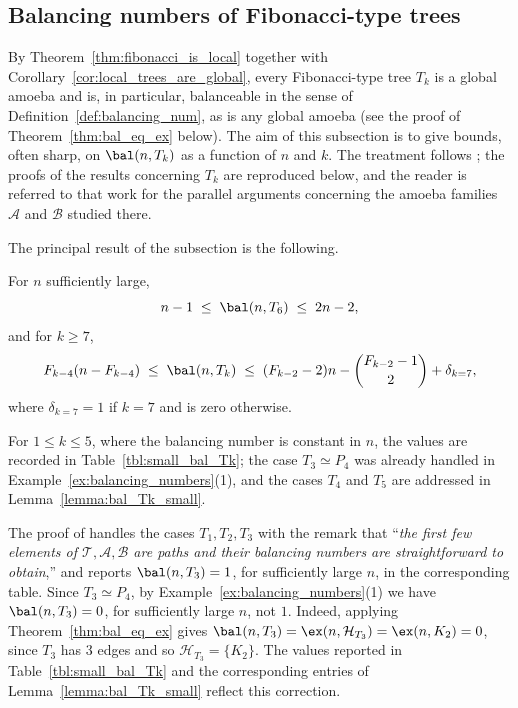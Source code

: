 
\subsection{Balancing numbers of Fibonacci-type trees}\label{subsec:balancing_Tk}

By Theorem~\ref{thm:fibonacci_is_local} together with Corollary~\ref{cor:local_trees_are_global}, every Fibonacci-type tree $T_k$ is a global amoeba and is, in particular, balanceable in the sense of Definition~\ref{def:balancing_num}, as is any global amoeba (see the proof of Theorem~\ref{thm:bal_eq_ex} below).
The aim of this subsection is to give bounds, often sharp, on $\bal(n,T_k)$ as a function of $n$ and $k$.
The treatment follows \cite[Section~4]{Eslavaetal2025}; the proofs of the results concerning $T_k$ are reproduced below, and the reader is referred to that work for the parallel arguments concerning the amoeba families $\mathcal A$ and $\mathcal B$ studied there.

The principal result of the subsection is the following.

\begin{theorem}\label{thm:bal_Tk_summary}
    For $n$ sufficiently large,
    $$
        n-1 \;\leq\; \bal(n,T_6) \;\leq\; 2n-2,
    $$
    and for $k\geq 7$,
    $$
        F_{k-4}(n-F_{k-4})\;\leq\;\bal(n,T_k)\;\leq\;(F_{k-2}-2)n-\binom{F_{k-2}-1}{2}+\delta_{k=7},
    $$
    where $\delta_{k=7}=1$ if $k=7$ and is zero otherwise.
\end{theorem}

For $1\leq k\leq 5$, where the balancing number is constant in $n$, the values are recorded in Table~\ref{tbl:small_bal_Tk}; the case $T_3\simeq P_4$ was already handled in Example~\ref{ex:balancing_numbers}(1), and the cases $T_4$ and $T_5$ are addressed in Lemma~\ref{lemma:bal_Tk_small}.

\begin{remark}\label{rem:T3_paper_typo}
    The proof of \cite[Lemma~24]{Eslavaetal2025} handles the cases $T_1,T_2,T_3$ with the remark that ``\emph{the first few elements of $\mathcal T,\mathcal A,\mathcal B$ are paths and their balancing numbers are straightforward to obtain},'' and reports $\bal(n,T_3)=1$, for sufficiently large $n$, in the corresponding table.
    Since $T_3\simeq P_4$, by Example~\ref{ex:balancing_numbers}(1) we have $\bal(n,T_3)=0$, for sufficiently large $n$, not $1$.
    Indeed, applying Theorem~\ref{thm:bal_eq_ex} gives $\bal(n,T_3)=\ex(n,\mathcal H_{T_3})=\ex(n,K_2)=0$, since $T_3$ has $3$ edges and so $\mathcal H_{T_3}=\{K_2\}$.
    The values reported in Table~\ref{tbl:small_bal_Tk} and the corresponding entries of Lemma~\ref{lemma:bal_Tk_small} reflect this correction.
\end{remark}

